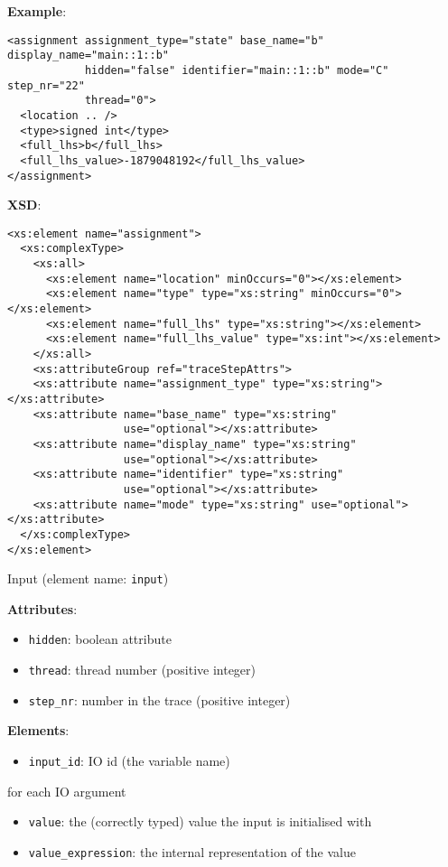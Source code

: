 \documentclass[12pt]{article}
\begin{document}
\noindent\textbf{Example}:
\begin{verbatim}
<assignment assignment_type="state" base_name="b" display_name="main::1::b"
            hidden="false" identifier="main::1::b" mode="C" step_nr="22"
            thread="0">
  <location .. />
  <type>signed int</type>
  <full_lhs>b</full_lhs>
  <full_lhs_value>-1879048192</full_lhs_value>
</assignment>
\end{verbatim}

\noindent\textbf{XSD}:
\begin{verbatim}
<xs:element name="assignment">
  <xs:complexType>
    <xs:all>
      <xs:element name="location" minOccurs="0"></xs:element>
      <xs:element name="type" type="xs:string" minOccurs="0"></xs:element>
      <xs:element name="full_lhs" type="xs:string"></xs:element>
      <xs:element name="full_lhs_value" type="xs:int"></xs:element>
    </xs:all>
    <xs:attributeGroup ref="traceStepAttrs">
    <xs:attribute name="assignment_type" type="xs:string"></xs:attribute>
    <xs:attribute name="base_name" type="xs:string"
                  use="optional"></xs:attribute>
    <xs:attribute name="display_name" type="xs:string"
                  use="optional"></xs:attribute>
    <xs:attribute name="identifier" type="xs:string"
                  use="optional"></xs:attribute>
    <xs:attribute name="mode" type="xs:string" use="optional"></xs:attribute>
  </xs:complexType>
</xs:element>
\end{verbatim}

\hrulefill

\begin{center}
{\Large Input} (element name: \texttt{input})
\end{center}

\noindent\textbf{Attributes}:
\begin{itemize}
\item \texttt{hidden}: boolean attribute
\item \texttt{thread}: thread number (positive integer)
\item \texttt{step\_nr}: number in the trace (positive integer)
\end{itemize}

\noindent\textbf{Elements}:
\begin{itemize}
\item \texttt{input\_id}: IO id (the variable name)
\end{itemize}
for each IO argument
\begin{itemize}
\item \texttt{value}: the (correctly typed) value the input is initialised with
\item \texttt{value\_expression}: the internal representation of the value
\end{itemize}
\end{document}
